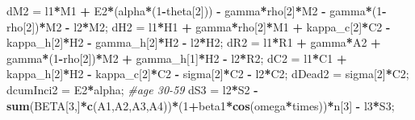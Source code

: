 \documentclass[
]{article}
\newenvironment{Shaded}{\begin{snugshade}}{\end{snugshade}}
\newcommand{\CommentTok}[1]{\textcolor[rgb]{0.56,0.35,0.01}{\textit{#1}}}
\newcommand{\DecValTok}[1]{\textcolor[rgb]{0.00,0.00,0.81}{#1}}
\newcommand{\KeywordTok}[1]{\textcolor[rgb]{0.13,0.29,0.53}{\textbf{#1}}}
\newcommand{\NormalTok}[1]{#1}
\newcommand{\OperatorTok}[1]{\textcolor[rgb]{0.81,0.36,0.00}{\textbf{#1}}}
\newcommand{\StringTok}[1]{\textcolor[rgb]{0.31,0.60,0.02}{#1}}
\begin{document}
\begin{Shaded}
\begin{Highlighting}[]
\NormalTok{    dM2 =}\StringTok{ }\NormalTok{l1}\OperatorTok{*}\NormalTok{M1 }\OperatorTok{+}\StringTok{ }\NormalTok{E2}\OperatorTok{*}\NormalTok{(alpha}\OperatorTok{*}\NormalTok{(}\DecValTok{1}\OperatorTok{-}\NormalTok{theta[}\DecValTok{2}\NormalTok{])) }\OperatorTok{-}\StringTok{ }\NormalTok{gamma}\OperatorTok{*}\NormalTok{rho[}\DecValTok{2}\NormalTok{]}\OperatorTok{*}\NormalTok{M2 }\OperatorTok{-}\StringTok{ }\NormalTok{gamma}\OperatorTok{*}\NormalTok{(}\DecValTok{1}\OperatorTok{-}\NormalTok{rho[}\DecValTok{2}\NormalTok{])}\OperatorTok{*}\NormalTok{M2 }\OperatorTok{-}\StringTok{ }\NormalTok{l2}\OperatorTok{*}\NormalTok{M2;}
\NormalTok{    dH2 =}\StringTok{ }\NormalTok{l1}\OperatorTok{*}\NormalTok{H1 }\OperatorTok{+}\StringTok{ }\NormalTok{gamma}\OperatorTok{*}\NormalTok{rho[}\DecValTok{2}\NormalTok{]}\OperatorTok{*}\NormalTok{M1 }\OperatorTok{+}\StringTok{ }\NormalTok{kappa_c[}\DecValTok{2}\NormalTok{]}\OperatorTok{*}\NormalTok{C2 }\OperatorTok{-}\StringTok{ }\NormalTok{kappa_h[}\DecValTok{2}\NormalTok{]}\OperatorTok{*}\NormalTok{H2 }\OperatorTok{-}\StringTok{ }\NormalTok{gamma_h[}\DecValTok{2}\NormalTok{]}\OperatorTok{*}\NormalTok{H2 }\OperatorTok{-}\StringTok{ }\NormalTok{l2}\OperatorTok{*}\NormalTok{H2;}
\NormalTok{    dR2 =}\StringTok{ }\NormalTok{l1}\OperatorTok{*}\NormalTok{R1 }\OperatorTok{+}\StringTok{ }\NormalTok{gamma}\OperatorTok{*}\NormalTok{A2 }\OperatorTok{+}\StringTok{ }\NormalTok{gamma}\OperatorTok{*}\NormalTok{(}\DecValTok{1}\OperatorTok{-}\NormalTok{rho[}\DecValTok{2}\NormalTok{])}\OperatorTok{*}\NormalTok{M2 }\OperatorTok{+}\StringTok{ }\NormalTok{gamma_h[}\DecValTok{1}\NormalTok{]}\OperatorTok{*}\NormalTok{H2 }\OperatorTok{-}\StringTok{ }\NormalTok{l2}\OperatorTok{*}\NormalTok{R2;}
\NormalTok{    dC2 =}\StringTok{ }\NormalTok{l1}\OperatorTok{*}\NormalTok{C1 }\OperatorTok{+}\StringTok{ }\NormalTok{kappa_h[}\DecValTok{2}\NormalTok{]}\OperatorTok{*}\NormalTok{H2 }\OperatorTok{-}\StringTok{ }\NormalTok{kappa_c[}\DecValTok{2}\NormalTok{]}\OperatorTok{*}\NormalTok{C2 }\OperatorTok{-}\StringTok{ }\NormalTok{sigma[}\DecValTok{2}\NormalTok{]}\OperatorTok{*}\NormalTok{C2 }\OperatorTok{-}\StringTok{ }\NormalTok{l2}\OperatorTok{*}\NormalTok{C2;}
\NormalTok{    dDead2 =}\StringTok{ }\NormalTok{sigma[}\DecValTok{2}\NormalTok{]}\OperatorTok{*}\NormalTok{C2;}
\NormalTok{    dcumInci2 =}\StringTok{ }\NormalTok{E2}\OperatorTok{*}\NormalTok{alpha;}
  \CommentTok{#age 30-59}
\NormalTok{    dS3 =}\StringTok{ }\NormalTok{l2}\OperatorTok{*}\NormalTok{S2 }\OperatorTok{-}\StringTok{ }\KeywordTok{sum}\NormalTok{(BETA[}\DecValTok{3}\NormalTok{,]}\OperatorTok{*}\KeywordTok{c}\NormalTok{(A1,A2,A3,A4))}\OperatorTok{*}\NormalTok{(}\DecValTok{1}\OperatorTok{+}\NormalTok{beta1}\OperatorTok{*}\KeywordTok{cos}\NormalTok{(omega}\OperatorTok{*}\NormalTok{times))}\OperatorTok{*}\NormalTok{n[}\DecValTok{3}\NormalTok{] }\OperatorTok{-}\StringTok{ }\NormalTok{l3}\OperatorTok{*}\NormalTok{S3;}

\end{Highlighting}
\end{Shaded}
\end{document}

